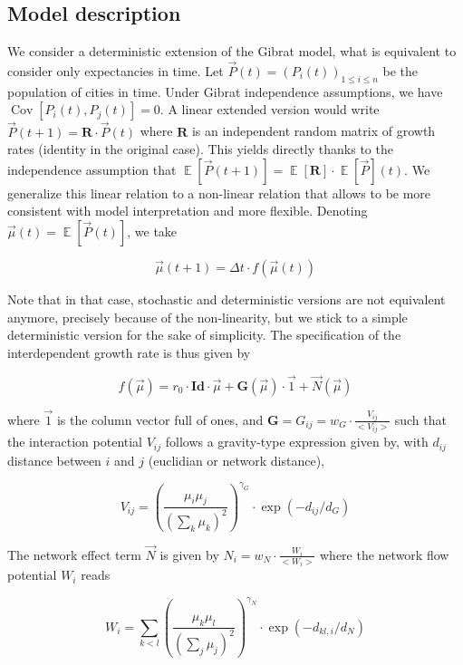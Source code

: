 \documentclass{article}
\DeclareMathOperator{\Cov}{Cov}
\DeclareMathOperator{\E}{\mathbb{E}}
\newcommand{\Covb}[2]{\ensuremath{\Cov\!\left[#1,#2\right]}}
\newcommand{\Eb}[1]{\ensuremath{\E\!\left[#1\right]}}
\begin{document}
\subsection*{Model description}

We consider a deterministic extension of the Gibrat model, what is equivalent to consider only expectancies in time. Let $\vec{P}(t)=(P_i(t))_{1\leq i\leq n}$ be the population of cities in time. Under Gibrat independence assumptions, we have $\Covb{P_i(t)}{P_j(t)}=0$. A linear extended version would write $\vec{P}(t+1)=\mathbf{R}\cdot \vec{P}(t)$ where $\mathbf{R}$ is an independent random matrix of growth rates (identity in the original case). This yields directly thanks to the independence assumption that $\Eb{\vec{P}(t+1)}=\Eb{\mathbf{R}}\cdot\Eb{\vec{P}}(t)$. We generalize this linear relation to a non-linear relation that allows to be more consistent with model interpretation and more flexible. Denoting $\vec{\mu}(t)=\Eb{\vec{P}(t)}$, we take

\begin{equation}
	\vec{\mu}(t+1)=\Delta t\cdot f(\vec{\mu}(t))
\end{equation}

Note that in that case, stochastic and deterministic versions are not equivalent anymore, precisely because of the non-linearity, but we stick to a simple deterministic version for the sake of simplicity. The specification of the interdependent growth rate is thus given by

\begin{equation}
f(\vec{\mu}) = r_0\cdot \mathbf{Id}\cdot \vec{\mu} + \mathbf{G}\left(\vec{\mu}\right)\cdot \vec{1} + \vec{N}\left(\vec{\mu}\right)
\end{equation}


where $\vec{1}$ is the column vector full of ones, and $\mathbf{G} = G_{ij} = w_G\cdot \frac{V_{ij}}{<V_{ij}>}$ such that the interaction potential $V_{ij}$ follows a gravity-type expression given by, with $d_{ij}$ distance between $i$ and $j$ (euclidian or network distance),

\begin{equation}
V_{ij} = \left(\frac{\mu_i\mu_j}{\left(\sum_k{\mu_k}\right)^2}\right)^{\gamma_G}\cdot \exp{\left(-d_{ij}/d_G\right)}
\end{equation}

The network effect term $\vec{N}$ is given by $N_{i} = w_N \cdot \frac{W_i}{<W_i>}$ where the network flow potential $W_i$ reads

\begin{equation}
W_{i} = \sum_{k < l} \left(\frac{\mu_k\mu_l}{\left(\sum_j\mu_j\right)^2}\right)^{\gamma_N} \cdot \exp{\left(-d_{kl,i}/d_N\right)}
\end{equation}
\end{document}
